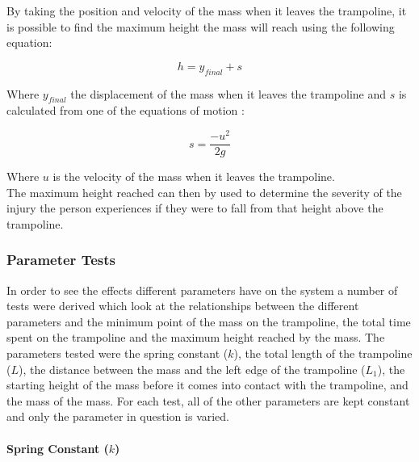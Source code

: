 \noindent By taking the position and velocity of the mass when it leaves the trampoline, it is possible to find the maximum height the mass will reach using the following equation:

\begin{equation}
h = y_{final} + s
\end{equation}

\noindent Where $y_{final}$ the displacement of the mass when it leaves the trampoline and $s$ is calculated from one of the equations of motion \cite{suvat}:

\begin{equation}
s = \frac{-u^2}{2g}
\end{equation}

\noindent Where $u$ is the velocity of the mass when it leaves the trampoline. \\

\noindent The maximum height reached can then by used to determine the severity of the injury the person experiences if they were to fall from that height above the trampoline. 

\subsubsection{Parameter Tests}\label{parametertests}
In order to see the effects different parameters have on the system a number of tests were derived which look at the relationships between the different parameters and the minimum point of the mass on the trampoline, the total time spent on the trampoline and the maximum height reached by the mass. The parameters tested were the spring constant ($k$), the total length of the trampoline ($L$), the distance between the mass and the left edge of the trampoline ($L_1$), the starting height of the mass before it comes into contact with the trampoline, and the mass of the mass. For each test, all of the other parameters are kept constant and only the parameter in question is varied.

\paragraph{Spring Constant ($k$)}\mbox{}\\

